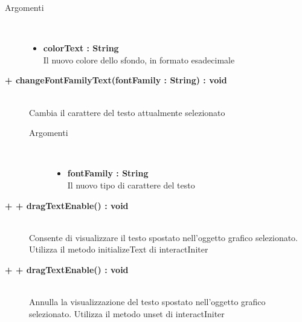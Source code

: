 \begin{description}
\begin{description}
		\begin{description}
			\item[Argomenti] \hfill \\
				\begin{itemize}
				
					\item \textbf{colorText : String} \hfill \\
					Il nuovo colore dello sfondo, in formato esadecimale
				\end{itemize}
				
		\end{description}
	\end{description}
	
	\begin{description}
		\item[\textbf{\color{blue}+ changeFontFamilyText(fontFamily : String) : void	 	}] \hfill \\
		Cambia il carattere del testo attualmente selezionato
			
		\begin{description}
			\item[Argomenti] \hfill \\
				\begin{itemize}
				
					\item \textbf{fontFamily : String} \hfill \\
					Il nuovo tipo di carattere del testo
				\end{itemize}
				
		\end{description}
	\end{description}
	
	\begin{description}
		\item[\textbf{\color{blue}+ + dragTextEnable() : void 	}] \hfill \\
		Consente di visualizzare il testo spostato nell'oggetto grafico selezionato. Utilizza il metodo initializeText di interactIniter

	\end{description}
	
	\begin{description}
		\item[\textbf{\color{blue}+ + dragTextEnable() : void 	}] \hfill \\
		Annulla la visualizzazione del testo spostato nell'oggetto grafico selezionato. Utilizza il metodo unset di interactIniter

	\end{description}
	
	
\end{description}